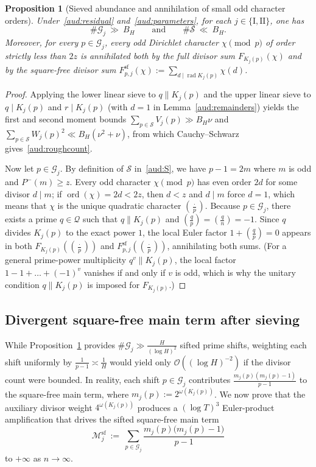 \documentclass[11pt, a4paper]{article}
\theoremstyle{plain}
\newtheorem{proposition}[theorem]{Proposition}
\theoremstyle{definition}
\newcommand{\leg}[2]{\left(\frac{#1}{#2}\right)}
\newcommand{\I}{\mathrm{I}}
\newcommand{\II}{\mathrm{II}}
\newcommand{\sfm}{\mathrm{sf}}
\DeclareMathOperator{\rad}{rad}
\DeclareMathOperator{\ord}{ord}
\begin{document}
\begin{proposition}[Sieved abundance and annihilation of small odd character orders]\label{aud:rough}
Under~\eqref{aud:residual} and~\eqref{aud:parameters}, for each $j\in\{\I,\II\}$, one has
\begin{equation}\label{aud:roughcount}
\#\mathcal{G}_j\ \gg\ B_H\qquad\text{and}\qquad \#\mathcal{S}\ \ll\ B_H.
\end{equation}
Moreover, for every $p\in\mathcal{G}_j$, every odd Dirichlet character $\chi\pmod p$ of order strictly less than $2z$ is annihilated both by the full divisor sum $F_{K_j(p)}(\chi)$ and by the square-free divisor sum $F_{p,j}^{\sfm}(\chi):=\sum_{d\mid\rad K_j(p)}\chi(d)$.
\end{proposition}
\begin{proof}
Applying the lower linear sieve to $q\parallel K_j(p)$ and the upper linear sieve to $q\mid K_j(p)$ and $r\mid K_j(p)$ (with $d=1$ in Lemma~\ref{aud:remainders}) yields the first and second moment bounds $\sum_{p\in\mathcal{S}}V_j(p)\gg B_H\nu$ and $\sum_{p\in\mathcal{S}}W_j(p)^{2}\ll B_H(\nu^{2}+\nu)$, from which Cauchy--Schwarz gives~\eqref{aud:roughcount}.

Now let $p\in\mathcal{G}_j$. By definition of $\mathcal{S}$ in~\eqref{aud:S}, we have $p-1=2m$ where $m$ is odd and $P^{-}(m)\ge z$. Every odd character $\chi\pmod p$ has even order $2d$ for some divisor $d\mid m$; if $\ord(\chi)=2d<2z$, then $d<z$ and $d\mid m$ force $d=1$, which means that $\chi$ is the unique quadratic character $\leg{\cdot}{p}$. Because $p\in\mathcal{G}_j$, there exists a prime $q\in\mathcal{Q}$ such that $q\parallel K_j(p)$ and $\leg{q}{p}=\leg{q}{n}=-1$. Since $q$ divides $K_j(p)$ to the exact power $1$, the local Euler factor $1+\leg{q}{p}=0$ appears in both $F_{K_j(p)}(\leg{\cdot}{p})$ and $F_{p,j}^{\sfm}(\leg{\cdot}{p})$, annihilating both sums. (For a general prime-power multiplicity $q^{v}\parallel K_j(p)$, the local factor $1-1+\dots+(-1)^{v}$ vanishes if and only if $v$ is odd, which is why the unitary condition $q\parallel K_j(p)$ is imposed for $F_{K_j(p)}$.)
\end{proof}

\subsection{Divergent square-free main term after sieving}\label{aud:weighted}

While Proposition~\ref{aud:rough} provides $\#\mathcal{G}_j\gg\frac{H}{(\log H)^{2}}$ sifted prime shifts, weighting each shift uniformly by $\frac{1}{p-1}\asymp\frac{1}{H}$ would yield only $\mathcal{O}((\log H)^{-2})$ if the divisor count were bounded. In reality, each shift $p\in\mathcal{G}_j$ contributes $\frac{m_j(p)(m_j(p)-1)}{p-1}$ to the square-free main term, where $m_j(p):=2^{\omega(K_j(p))}$. We now prove that the auxiliary divisor weight $4^{\omega(K_j(p))}$ produces a $(\log T)^{3}$ Euler-product amplification that drives the sifted square-free main term
\[
\mathcal{M}_j^{\sfm}\ :=\ \sum_{p\in\mathcal{G}_j}\frac{m_j(p)\big(m_j(p)-1\big)}{p-1}
\]
to $+\infty$ as $n\to\infty$.
\end{document}
